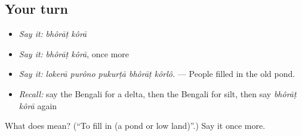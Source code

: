 \subsection*{Your turn}
\begin{itemize}
\raggedright
  \item \emph{Say it:} \emph{bhôrāṭ kôrā}
  \item \emph{Say it:} \emph{bhôrāṭ kôrā}, once more
  \item \emph{Say it:} \emph{lokerā purôno pukurṭā bhôrāṭ kôrlô.} — People filled in the old pond.
  \item \emph{Recall:} say the Bengali for a delta, then the Bengali for silt, then say \emph{bhôrāṭ kôrā} again
\end{itemize}

\begin{tcolorbox}[breakable,colback=teal!4,colframe=teal!35!black,title={Before you move on}]
What does   mean? (\textquotedblleft{}To fill in (a pond or low land)\textquotedblright{}.) Say it once more.
\end{tcolorbox}
